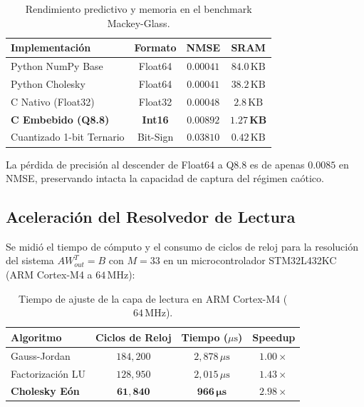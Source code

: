 \documentclass[10pt,twocolumn]{article}
\begin{document}
\begin{table}[h]
\centering
\small
\begin{tabular}{lccc}
\toprule
\textbf{Implementación} & \textbf{Formato} & \textbf{NMSE} & \textbf{SRAM} \\
\midrule
Python NumPy Base       & Float64          & $0.00041$     & $84.0\,\text{KB}$ \\
Python Cholesky         & Float64          & $0.00041$     & $38.2\,\text{KB}$ \\
C Nativo (Float32)      & Float32          & $0.00048$     & $2.8\,\text{KB}$ \\
\textbf{C Embebido (Q8.8)} & \textbf{Int16} & $\mathbf{0.00892}$ & $\mathbf{1.27\,\text{KB}}$ \\
Cuantizado 1-bit Ternario & Bit-Sign       & $0.03810$     & $0.42\,\text{KB}$ \\
\bottomrule
\end{tabular}
\caption{Rendimiento predictivo y memoria en el benchmark Mackey-Glass.}
\label{tab:mackey_glass}
\end{table}

La pérdida de precisión al descender de Float64 a Q8.8 es de apenas $0.0085$ en NMSE, preservando intacta la capacidad de captura del régimen caótico.

\subsection{Aceleración del Resolvedor de Lectura}

Se midió el tiempo de cómputo y el consumo de ciclos de reloj para la resolución del sistema $A W_{out}^T = B$ con $M=33$ en un microcontrolador STM32L432KC (ARM Cortex-M4 a $64\,\text{MHz}$):

\begin{table}[h]
\centering
\small
\begin{tabular}{lccc}
\toprule
\textbf{Algoritmo} & \textbf{Ciclos de Reloj} & \textbf{Tiempo ($\mu\text{s}$)} & \textbf{Speedup} \\
\midrule
Gauss-Jordan & $184,200$ & $2,878\,\mu\text{s}$ & $1.00\times$ \\
Factorización LU & $128,950$ & $2,015\,\mu\text{s}$ & $1.43\times$ \\
\textbf{Cholesky Eón} & $\mathbf{61,840}$ & $\mathbf{966\,\mu\text{s}}$ & $\mathbf{2.98\times}$ \\
\bottomrule
\end{tabular}
\caption{Tiempo de ajuste de la capa de lectura en ARM Cortex-M4 ($64\,\text{MHz}$).}
\label{tab:solver_speedup}
\end{table}
\end{document}
